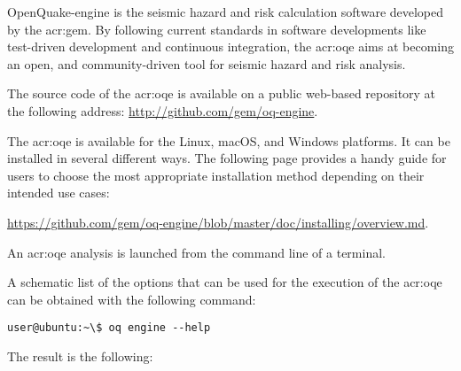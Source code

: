 OpenQuake-engine is the seismic hazard and risk calculation software developed by
the \glsdesc{acr:gem}. By following current standards in software
developments like test-driven development and continuous integration, the
\glsdesc{acr:oqe} aims at becoming an open, and community-driven tool for
seismic hazard and risk analysis.

The source code of the \glsdesc{acr:oqe} is available on a public web-based
repository at the following address:
\href{http://github.com/gem/oq-engine}{http://github.com/gem/oq-engine}.

The \glsdesc{acr:oqe} is available for the Linux, macOS, and Windows
platforms. It can be installed in several different ways. The following page
provides a handy guide for users to choose the most appropriate installation
method depending on their intended use cases:

\href{https://github.com/gem/oq-engine/blob/master/doc/installing/overview.md}{https://github.com/gem/oq-engine/blob/master/doc/installing/overview.md}.

An \gls{acr:oqe} analysis is launched from the command line of a terminal.

A schematic list of the options that can be used for the execution of the
\gls{acr:oqe} can be obtained with the following command:

\begin{verbatim}
user@ubuntu:~\$ oq engine --help
\end{verbatim}

The result is the following:
\inputminted[firstline=1,fontsize=\footnotesize,frame=single]{shell-session}{oqum/help.txt}
